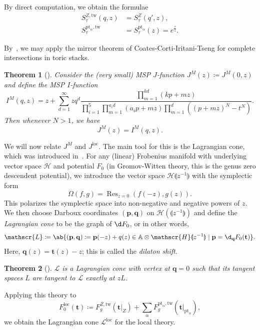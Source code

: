 \documentclass[10pt]{amsart}
\newtheorem{thm}{Theorem}[section]
\theoremstyle{definition}
\theoremstyle{remark}
\theoremstyle{plain}
\theoremstyle{definition}
\theoremstyle{remark}
\newcommand{\A}{\mathbb{A}}
\newcommand{\msc}[1]{\mathscr{#1}}
\newcommand{\mbf}[1]{\mathbf{#1}}
\newcommand{\mr}[1]{\mathrm{#1}}
\newcommand{\on}[1]{\operatorname{#1}}
\newcommand{\1}{\mathbf{1}}
\newcommand{\2}{\mathbf{2}}
\newcommand{\3}{\mathbf{3}}
\newcommand{\pt}{\mr{pt}}
\newcommand{\loc}{\mr{loc}}
\newcommand{\tw}{\mr{tw}}
\numberwithin{equation}{section}
\begin{document}
By direct computation, we obtain the formulae
\begin{align*}
    S_{\tau}^{Z, \tw}(q,z) &= S_{\tau}^{Z}(q', z), \\
    S_{\tau}^{\pt_{\alpha}, \tw} &= S_{\tau}^{\pt_{\alpha}}(z) = e^{\frac{\tau}{z}}.
\end{align*}

By~, we may apply the mirror theorem of Coates-Corti-Iritani-Tseng for complete intersections in toric stacks.
\begin{thm}[{\cite[Corollary 28]{applmirrortoricstack}}]\label{thm:mirror}
    Consider the (very small) MSP $J$-function $J^M(z) \coloneqq J^M(0,z)$ and define the MSP $I$-function
    \begin{equation}\label{eqn:mspifn}
        I^M(q, z) = z + \sum_{d=1}^{\infty} z q^d \frac{\prod_{m=1}^{kd}(kp+mz)}{\prod_{i=1}^5 \prod_{m=1}^{a_i d}(a_i p + mz) \prod_{m=1}^d ((p+mz)^N - t^N)}.
    \end{equation}
    Then whenever $N > 1$, we have
    \[ J^M(z) = I^M(q, z). \]
\end{thm}

We will now relate $J^M$ and $J^{\loc}$. The main tool for this is the Lagrangian cone, which was introduced in~\cite{qrr,symplfrob}. For any (linear) Frobenius manifold with underlying vector space $\msc{H}$ and potential $F_0$ (in Gromov-Witten theory, this is the genus zero descendent potential), we introduce the vector space $\msc{H}\llparenthesis z^{-1} \rrparenthesis$ with the symplectic form
\[ \Omega(f,g) = \on{Res}_{z=0}(f(-z), g(z)). \]
This polarizes the symplectic space into non-negative and negative powers of $z$. We then choose Darboux coordinates $(\mbf{p}, \mbf{q})$ on $\msc{H}(\llparenthesis z^{-1} \rrparenthesis)$ and define the \textit{Lagrangian cone} to be the graph of $\d F_0$, or in other words,
\[ \msc{L} \coloneqq \ab\{(\mbf{p}, \mbf{q}) \coloneqq \mbf{p}(-z) + q(z) \in \A \otimes \msc{H}\llparenthesis z^{-1} \rrparenthesis \mid \mbf{p} = \d_{\mbf{q}} F_0(\mbf{t}) \}. \]
Here, $\mbf{q}(z) = \mbf{t}(z) - z$; this is called the \textit{dilaton shift}.

\begin{thm}[{\cite[Theorem 1]{symplfrob}}]
    $\msc{L}$ is a Lagrangian cone with vertex at $\mbf{q} = 0$ such that its tangent spaces $L$ are tangent to $\msc{L}$ exactly at $zL$.
\end{thm}

Applying this theory to
\[ F_0^{\loc}(\mbf{t}) \coloneqq F_g^{Z, \tw}(\mbf{t}|_{Z}) + \sum_{\alpha} F_g^{\pt_{\alpha}, \tw}(\mbf{t}|_{\pt_{\alpha}}), \]
we obtain the Lagrangian cone $\msc{L}^{\loc}$ for the local theory.
\end{document}
